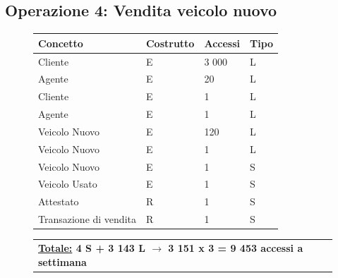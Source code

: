 \documentclass[a4paper,12pt]{report}
\begin{document}
\subsection*{Operazione 4: Vendita veicolo nuovo}
\begin{figure}[ht]
	\centering
	\begin{tabular}{L{4.2cm}C{2cm}C{4.5cm}C{2cm}}
		\rule[-2mm]{0mm}{0.6cm}{}
		\textbf{Concetto} & \textbf{Costrutto} &\textbf{Accessi} & \textbf{Tipo} \\
		\hline\rule[-2mm]{0mm}{0.65cm}{}
		Cliente & E & 3 000 & L \\
		\hline\rule[-2mm]{0mm}{0.65cm}{}
		Agente & E & 20 & L \\
		\hline\rule[-2mm]{0mm}{0.65cm}{}
		Cliente & E & 1 & L \\
		\hline\rule[-2mm]{0mm}{0.65cm}{}
		Agente & E & 1 & L \\
		\hline\rule[-2mm]{0mm}{0.65cm}{}
		Veicolo Nuovo & E & 120 & L \\
		\hline\rule[-2mm]{0mm}{0.65cm}{}
		Veicolo Nuovo & E & 1 & L \\
		\hline\rule[-2mm]{0mm}{0.65cm}{}
		Veicolo Nuovo & E & 1 & S \\
		\hline\rule[-2mm]{0mm}{0.65cm}{}
		Veicolo Usato & E & 1 & S \\
		\hline\rule[-2mm]{0mm}{0.65cm}{}
		Attestato & R & 1 & S \\
		\hline\rule[-2mm]{0mm}{0.65cm}{}
		Transazione di vendita& R & 1 & S \\
	\end{tabular}
	
	\begin{tabular}{C{13.9cm}}
		\rule[-3mm]{0mm}{0.85cm}{}	
		 \textbf{\underline{Totale:} 4 S +  3 143 L $\to$ 3 151 x 3 = 9 453 accessi a settimana}
	\end{tabular}
\end{figure}
\end{document}
